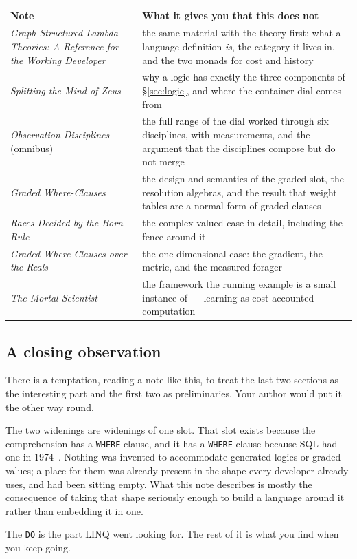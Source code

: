 \begin{center}
\small
\begin{tabular}{@{}L{0.40\textwidth}L{0.54\textwidth}@{}}
\toprule
\textbf{Note} & \textbf{What it gives you that this does not} \\
\midrule
\emph{Graph-Structured Lambda Theories: A Reference for the Working
Developer}~\cite{GSLTintro} &
the same material with the theory first: what a language definition
\emph{is}, the category it lives in, and the two monads for cost and history \\[3pt]
\emph{Splitting the Mind of Zeus}~\cite{Zeus} &
why a logic has exactly the three components of \S\ref{sec:logic}, and where the
container dial comes from \\[3pt]
\emph{Observation Disciplines} (omnibus)~\cite{ObsDisc} &
the full range of the dial worked through six disciplines, with measurements,
and the argument that the disciplines compose but do not merge \\[3pt]
\emph{Graded Where-Clauses}~\cite{GradedWhere} &
the design and semantics of the graded slot, the resolution algebras, and the
result that weight tables are a normal form of graded clauses \\[3pt]
\emph{Races Decided by the Born Rule}~\cite{GWQuantum} &
the complex-valued case in detail, including the fence around it \\[3pt]
\emph{Graded Where-Clauses over the Reals}~\cite{GWPLN} &
the one-dimensional case: the gradient, the metric, and the measured forager \\[3pt]
\emph{The Mortal Scientist}~\cite{ScientistNote} &
the framework the running example is a small instance of --- learning as
cost-accounted computation \\
\bottomrule
\end{tabular}
\end{center}

\subsection{A closing observation}

There is a temptation, reading a note like this, to treat the last two sections
as the interesting part and the first two as preliminaries. Your author would
put it the other way round.

The two widenings are widenings of one slot. That slot exists because the
comprehension has a \texttt{WHERE} clause, and it has a \texttt{WHERE} clause
because SQL had one in 1974~\cite{ChamberlinBoyce74}. Nothing was invented to accommodate generated
logics or graded values; a place for them was already present in the shape every
developer already uses, and had been sitting empty. What this note describes is
mostly the consequence of taking that shape seriously enough to build a language
around it rather than embedding it in one.

The \texttt{DO} is the part LINQ went looking for. The rest of it is what you
find when you keep going.
